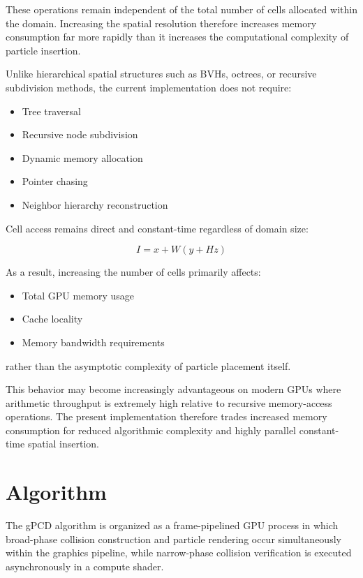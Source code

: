 \documentclass{article}
\begin{document}
These operations remain independent of the total number of cells allocated within the domain. Increasing the spatial resolution therefore increases memory consumption far more rapidly than it increases the computational complexity of particle insertion.

Unlike hierarchical spatial structures such as BVHs, octrees, or recursive subdivision methods, the current implementation does not require:

\begin{itemize}
    \item Tree traversal
    \item Recursive node subdivision
    \item Dynamic memory allocation
    \item Pointer chasing
    \item Neighbor hierarchy reconstruction
\end{itemize}

Cell access remains direct and constant-time regardless of domain size:

\[
I = x + W(y + Hz)
\]

As a result, increasing the number of cells primarily affects:

\begin{itemize}
    \item Total GPU memory usage
    \item Cache locality
    \item Memory bandwidth requirements
\end{itemize}

rather than the asymptotic complexity of particle placement itself.

This behavior may become increasingly advantageous on modern GPUs where arithmetic throughput is extremely high relative to recursive memory-access operations. The present implementation therefore trades increased memory consumption for reduced algorithmic complexity and highly parallel constant-time spatial insertion.
\section{Algorithm}

The gPCD algorithm is organized as a frame-pipelined GPU process in which broad-phase collision construction and particle rendering occur simultaneously within the graphics pipeline, while narrow-phase collision verification is executed asynchronously in a compute shader.
\end{document}
